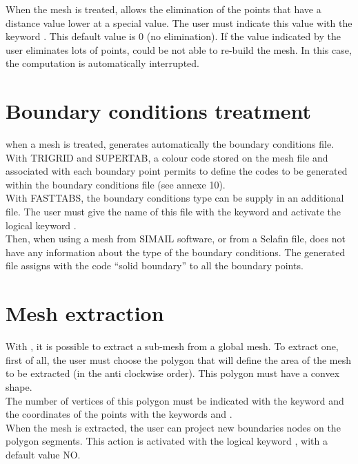 When the mesh is treated, \stbtel allows the elimination of the points that
have a distance value lower at a special value. The user must indicate this
value with the keyword . This
default value is 0 (no elimination). If the value indicated by the user
eliminates lots of points, \stbtel could be not able to re-build the mesh. In
this case, the computation is automatically interrupted.

\section{Boundary conditions treatment}
when a mesh is treated, \stbtel generates automatically the boundary conditions
file.\\
With TRIGRID and SUPERTAB, a colour code stored on the mesh file and associated
with each boundary point permits \stbtel to define the codes to  be generated
within the boundary conditions file (see annexe 10).\\
With FASTTABS, the boundary conditions type can be supply in an additional
file. The user must give the name of this file with the keyword  and activate the logical keyword .\\
Then, when using a mesh from SIMAIL software, or from a Selafin file, \stbtel
does not have any information about the type of the boundary conditions. The
generated file assigns with the code “solid boundary” to all the boundary
points.

\section{Mesh extraction}
With \stbtel, it is possible to extract a sub-mesh from a global mesh. To
extract one, first of all, the user must choose the polygon that will define
the area of the mesh to be extracted (in the anti clockwise order). This
polygon must have a convex shape.\\
The number of vertices of this polygon must be indicated with the keyword
 and the
coordinates of the points with the keywords  and  .\\
When the mesh is extracted, the user can project new boundaries nodes on the
polygon segments. This action is activated with the logical keyword
, with a default value NO.
